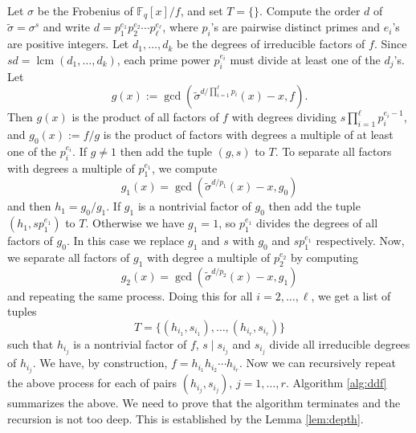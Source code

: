 \documentclass{article}
\theoremstyle{plain}
\theoremstyle{definition}
\DeclareMathOperator{\lcm}{lcm} %
\def\F{\ensuremath{\mathbb{F}}}
\begin{document}
Let $\sigma$ be the Frobenius of $\F_q[x] / f$, and set $T = \{\}$. Compute the order $d$ of 
$\tilde{\sigma} = \sigma^s$ and write $d = p_1^{e_1} p_2^{e_2} \cdots p_\ell^{e_\ell}$, where 
$p_i$'s are pairwise distinct primes and $e_i$'s are positive integers. Let $d_1, \dots,
d_k$ be the degrees of irreducible factors of $f$. Since $sd = \lcm(d_1, \dots, d_k)$, each prime 
power $p_i^{e_i}$ must divide at least one of the $d_j$'s. Let 
\[ g(x) := \gcd(\tilde{\sigma}^{d / \prod_{i = 1}^\ell p_i}(x) - x, f). \]
Then $g(x)$ is the product of all factors of $f$ with degrees dividing $s \prod_{i = 1}^\ell 
p_i^{e_i - 1}$, and $g_0(x) := f / g$ is the product of factors with degrees a multiple of at least 
one of the $p_i^{e_i}$. If $g \ne 1$ then add the tuple $(g, s)$ to $T$. To separate all factors 
with degrees a multiple of $p_1^{e_1}$, we compute
\[ g_1(x) = \gcd(\tilde{\sigma}^{d / p_1}(x) - x, g_0) \]
and then $h_1 = g_0 / g_1$. If $g_1$ is a nontrivial factor of $g_0$ then add the tuple $(h_1, 
sp_1^{e_1})$ to $T$. Otherwise we have $g_1 = 1$, so $p_1^{e_1}$ divides the degrees of all factors 
of $g_0$. In this case we replace $g_1$ and $s$ with $g_0$ and $sp_1^{e_1}$ respectively. Now, we 
separate all factors of $g_1$ with degree a multiple of $p_2^{e_2}$ by computing
\[ g_2(x) = \gcd(\tilde{\sigma}^{d / p_2}(x) - x, g_1) \]
and repeating the same process. Doing this for all $i = 2, \dots, \ell$, we get a list of tuples
\begin{equation}
\label{equ:tuple}
	T = \{ (h_{i_1}, s_{i_1}), \dots, (h_{i_r}, s_{i_r}) \}
\end{equation}
such that $h_{i_j}$ is a nontrivial factor of $f$, $s \mid s_{i_j}$ and $s_{i_j}$ divide all 
irreducible degrees of $h_{i_j}$. We have, by construction, $f = h_{i_1}h_{i_2} \cdots h_{i_r}$. 
Now we can recursively repeat the above process for each of pairs $(h_{i_j}, s_{i_j})$, $j = 1, 
\dots, r$. Algorithm \ref{alg:ddf} summarizes the above. We need to prove that the algorithm
terminates and the recursion is not too deep. This is established by the Lemma \ref{lem:depth}.
\end{document}
